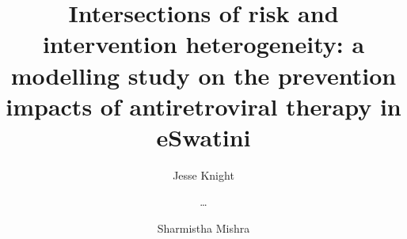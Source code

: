 \title{Intersections of risk and intervention heterogeneity:
  a modelling study on the prevention impacts of antiretroviral therapy in eSwatini}
\author[1]{Jesse Knight}
\author[1]{\dots}
\author[1]{Sharmistha Mishra}
\abstract{}
\data{}
\funding{}
\acknowl{}
\contrib{}
